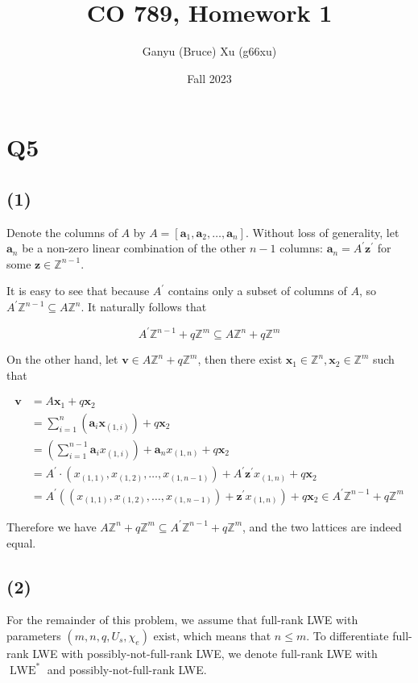 \documentclass{article}
\title{CO 789, Homework 1}
\author{Ganyu (Bruce) Xu (g66xu)}
\date{Fall 2023}
\begin{document}

\section*{Q5}
\subsection*{(1)}
Denote the columns of $A$ by $A = [\mathbf{a}_1, \mathbf{a}_2, \ldots, \mathbf{a}_n]$. Without loss of generality, let $\mathbf{a}_n$ be a non-zero linear combination of the other $n-1$ columns: $\mathbf{a}_n = A^\prime \mathbf{z}^\prime$ for some $\mathbf{z} \in \mathbb{Z}^{n-1}$.

It is easy to see that because $A^\prime$ contains only a subset of columns of $A$, so $A^\prime\mathbb{Z}^{n-1} \subseteq A\mathbb{Z}^n$. It naturally follows that

$$
A^\prime\mathbb{Z}^{n-1} + q\mathbb{Z}^m \subseteq A\mathbb{Z}^n + q\mathbb{Z}^m
$$


On the other hand, let $\mathbf{v} \in A \mathbb{Z}^{n} + q\mathbb{Z}^m$, then there exist $\mathbf{x}_1 \in \mathbb{Z}^n, \mathbf{x}_2 \in \mathbb{Z}^m$ such that 

$$
\begin{aligned}
\mathbf{v} &= A\mathbf{x}_1 + q\mathbf{x}_2 \\
&= \sum_{i=1}^n(\mathbf{a}_i \mathbf{x}_{(1, i)}) + q\mathbf{x}_2 \\
&= (\sum_{i=1}^{n-1}\mathbf{a}_i x_{(1, i)}) + \mathbf{a}_n x_{(1, n)} + q\mathbf{x}_2 \\
&= A^\prime \cdot (x_{(1, 1)}, x_{(1, 2)}, \ldots, x_{(1, n-1)}) + A^\prime\mathbf{z}^\prime x_{(1, n)} + q\mathbf{x}_2 \\
&= A^\prime((x_{(1, 1)}, x_{(1, 2)}, \ldots, x_{(1, n-1)}) + \mathbf{z}^\prime x_{(1, n)}) + q\mathbf{x}_2 \in A^\prime\mathbb{Z}^{n-1} + q\mathbb{Z}^m
\end{aligned}
$$

Therefore we have $A\mathbb{Z}^{n} + q\mathbb{Z}^m \subseteq A^\prime\mathbb{Z}^{n-1} + q\mathbb{Z}^m$, and the two lattices are indeed equal.

\subsection*{(2)}
For the remainder of this problem, we assume that full-rank LWE with parameters $(m, n, q, U_s, \chi_e)$ exist, which means that $n \leq m$. To differentiate full-rank LWE with possibly-not-full-rank LWE, we denote full-rank LWE with $\operatorname{LWE}^\ast$ and possibly-not-full-rank LWE.
\end{document}
